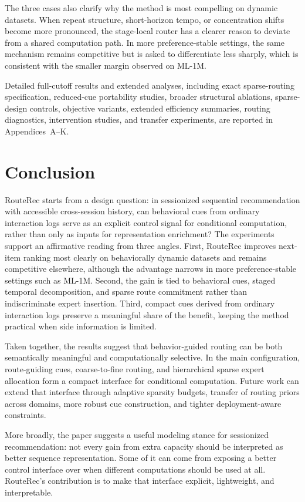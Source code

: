 \documentclass[sigconf,review,anonymous]{acmart}
\begin{document}
The three cases also clarify why the method is most compelling on dynamic datasets. When repeat structure, short-horizon tempo, or concentration shifts become more pronounced, the stage-local router has a clearer reason to deviate from a shared computation path. In more preference-stable settings, the same mechanism remains competitive but is asked to differentiate less sharply, which is consistent with the smaller margin observed on ML-1M.

Detailed full-cutoff results and extended analyses, including exact sparse-routing specification, reduced-cue portability studies, broader structural ablations, sparse-design controls, objective variants, extended efficiency summaries, routing diagnostics, intervention studies, and transfer experiments, are reported in Appendices~A--K.

\section{Conclusion}
\label{sec:conclusion}
RouteRec starts from a design question: in sessionized sequential recommendation with accessible cross-session history, can behavioral cues from ordinary interaction logs serve as an explicit control signal for conditional computation, rather than only as inputs for representation enrichment? The experiments support an affirmative reading from three angles. First, RouteRec improves next-item ranking most clearly on behaviorally dynamic datasets and remains competitive elsewhere, although the advantage narrows in more preference-stable settings such as ML-1M. Second, the gain is tied to behavioral cues, staged temporal decomposition, and sparse route commitment rather than indiscriminate expert insertion. Third, compact cues derived from ordinary interaction logs preserve a meaningful share of the benefit, keeping the method practical when side information is limited.

Taken together, the results suggest that behavior-guided routing can be both semantically meaningful and computationally selective. In the main configuration, route-guiding cues, coarse-to-fine routing, and hierarchical sparse expert allocation form a compact interface for conditional computation. Future work can extend that interface through adaptive sparsity budgets, transfer of routing priors across domains, more robust cue construction, and tighter deployment-aware constraints.

More broadly, the paper suggests a useful modeling stance for sessionized recommendation: not every gain from extra capacity should be interpreted as better sequence representation. Some of it can come from exposing a better control interface over when different computations should be used at all. RouteRec's contribution is to make that interface explicit, lightweight, and interpretable.
\end{document}
